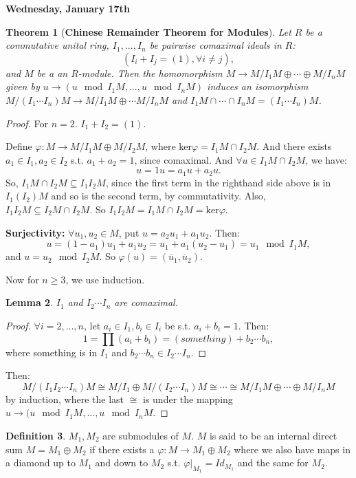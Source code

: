 \documentclass[12pt]{amsbook}
\theoremstyle{plain}
\newtheorem{theorem}{Theorem}[chapter]
\numberwithin{section}{chapter}
\numberwithin{equation}{chapter}
\newtheorem{lem}[theorem]{Lemma}
\theoremstyle{definition}
\newtheorem{Def}[theorem]{Definition}
\theoremstyle{remark}
\newcommand{\sub}{\subseteq}
\renewcommand{\geq}{\geqslant}
\renewcommand{\phi}{\varphi}
\begin{document}
\textbf{Wednesday, January 17th}

\begin{theorem}[\textbf{Chinese Remainder Theorem for Modules}]
Let $R$ be a commutative unital ring, $I_1,...,I_n$ be pairwise comaximal ideals in $R$:
$$
(I_i + I_j = (1),\forall i\neq j),
$$
and $M$ be a an $R$-module. Then the homomorphism $M \to M/I_1M \oplus \cdots \oplus M/I_nM$ given by $u \to (u \mod I_1M,...,u \mod I_nM)$ induces an isomorphism $M/(I_1\cdots I_n)M \to M/I_1M \oplus \cdots M/I_nM$ and $I_1M \cap \cdots \cap I_nM = (I_1 \cdots I_n)M$. 
\end{theorem}
\begin{proof}
For $n = 2$. $I_1 + I_2 = (1)$. 

Define $\phi: M \to M/I_1M \oplus M/I_2M$, where ker$\phi = I_1M \cap I_2M$. And there exists $a_1 \in I_1,a_2 \in I_2$ s.t. $a_1 + a_2 = 1$, since comaximal. And $\forall u \in I_1M \cap I_2M$, we have:
$$
u = 1u = a_1u + a_2u.
$$
So, $I_1M \cap I_2M \sub I_1I_2M$, since the first term in the righthand side above is in $I_1(I_2)M$ and so is the second term, by commutativity. Also, $I_1I_2M \sub I_2M \cap I_2M$. So $I_1I_2M = I_1M \cap I_2M = \text{ker}\phi$. 

\textbf{Surjectivity: } $\forall u_1,u_2 \in M$, put $u = a_2u_1 + a_1u_2$. Then:
$$
u = (1 - a_1)u_1  + a_1u_2 = u_1 + a_1(u_2 - u_1) = u_1 \mod I_1M,
$$
and $u = u_2 \mod I_2M$. So $\phi(u) = (\overline{u}_1,\overline{u}_2)$. 

Now for $n \geq 3$, we use induction. 
\begin{lem}
$I_1$ and $I_2\cdots I_n$ are comaximal. 
\end{lem}
\begin{proof}
$\forall i = 2,...,n$, let $a_i \in I_1,b_i \in I_i$ be s.t. $a_i + b_i = 1$. Then:
$$
1 = \prod(a_i + b_i) = (something ) + b_2\cdots b_n,
$$
where something is in $I_1$ and $b_2\cdots b_n \in I_2\cdots I_n$. 
\end{proof}
Then:
$$
M/(I_1I_2 \cdots I_n)M \cong M/I_1 \oplus M/(I_2\cdots I_n)M \cong \cdots \cong M/I_1M \oplus \cdots \oplus M/I_nM
$$
by induction, where the last $\cong$ is under the mapping $u \to (u \mod I_1M ,...,u \mod I_nM$. 
\end{proof}



\begin{Def}
$M_1,M_2$ are submodules of $M$. $M$ is said to be an internal direct sum $M = M_1 \oplus M_2$ if there exists a $\phi: M \to M_1 \oplus M_2$ where we also have maps in a diamond up to $M_1$ and down to $M_2$ s.t. $\phi|_{M_1} = Id_{M_1}$ and the same for $M_2$. 
\end{Def}
\end{document}
